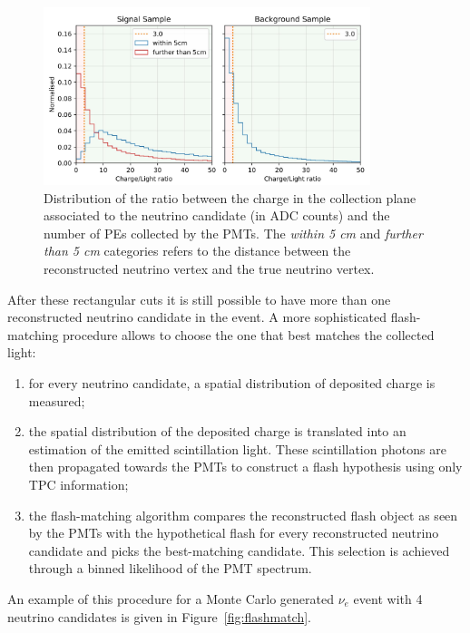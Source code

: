 \begin{figure}[htbp]
\centering
\includegraphics[width=0.85\textwidth]{figures/light_ratio.jpg} 
\caption{Distribution of the ratio between the charge in the collection plane associated to the neutrino candidate (in ADC counts) and the number of PEs collected by the PMTs. The \emph{within 5 cm} and \emph{further than 5 cm} categories refers to the distance between the reconstructed neutrino vertex and the true neutrino vertex.} 
\label{fig:light_ratio}
\end{figure}

After these rectangular cuts it is still possible to have more than one reconstructed neutrino candidate in the event. A more sophisticated flash-matching procedure allows to choose the one that best matches the collected light:
\begin{enumerate}
\item for every neutrino candidate, a spatial distribution of deposited charge is measured;
\item the spatial distribution of the deposited charge is translated into an estimation of the emitted scintillation light. These scintillation photons are then propagated towards the PMTs to construct a flash hypothesis using only TPC information;
\item the flash-matching algorithm compares the reconstructed flash object as seen by the PMTs with the hypothetical flash for every reconstructed neutrino candidate and picks the best-matching candidate. This selection is achieved through a binned likelihood of the PMT spectrum.
\end{enumerate}


An example of this procedure for a Monte Carlo generated $\nu_e$ event with 4 neutrino candidates is given in Figure~\ref{fig:flashmatch}.

